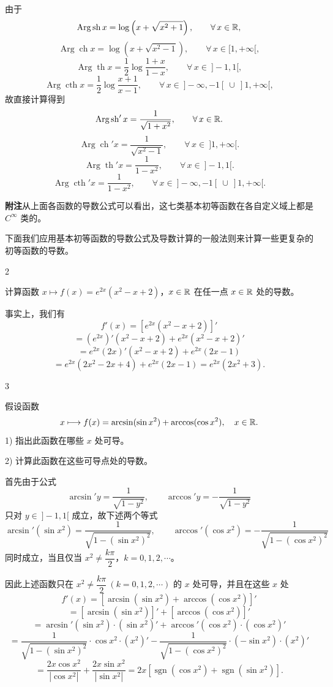 由于
\[
\operatorname{Arg}\operatorname{sh}x=\log\left(x+\sqrt{x^2+1}\right),\qquad\forall\,x\in\mathbb{R},
\]
\[
\operatorname{Arg}\operatorname{ch}x=\log\left(x+\sqrt{x^2-1}\right),\qquad\forall\,x\in[1,+\infty[,
\]
\[
\operatorname{Arg}\operatorname{th}x=\frac12\log\frac{1+x}{1-x},\qquad\forall\,x\in\ ]-1,1[,
\]
\[
\operatorname{Arg}\operatorname{cth}x=\frac12\log\frac{x+1}{x-1},\qquad\forall\,x\in\ ]-\infty,-1[\ \cup\ ]1,+\infty[,
\]
故直接计算得到
\[
\operatorname{Arg}\operatorname{sh}'x=\frac1{\sqrt{1+x^2}},\qquad\forall\,x\in\mathbb{R}.
\]
\[
\operatorname{Arg}\operatorname{ch}'x=\frac1{\sqrt{x^2-1}},\qquad\forall\,x\in\ ]1,+\infty[.
\]
\[
\operatorname{Arg}\operatorname{th}'x=\frac1{1-x^2},\qquad\forall\,x\in\ ]-1,1[.
\]
\[
\operatorname{Arg}\operatorname{cth}'x=\frac1{1-x^2},\qquad\forall\,x\in\ ]-\infty,-1[\ \cup\ ]1,+\infty[.
\]

\textbf{附注}\quad 从上面各函数的导数公式可以看出，这七类基本初等函数在各自定义域上都是 \(C^\infty\) 类的。

下面我们应用基本初等函数的导数公式及导数计算的一般法则来计算一些更复杂的初等函数的导数。

\begin{sourceexample}{2}

	计算函数 \(x\longmapsto f(x)=e^{2x}(x^2-x+2)\)，\(x\in\mathbb{R}\) 在任一点 \(x\in\mathbb{R}\) 处的导数。

	事实上，我们有
	\[
	f'(x)=[e^{2x}(x^2-x+2)]'
	\]
	\[
	=(e^{2x})'(x^2-x+2)+e^{2x}(x^2-x+2)'
	\]
	\[
	=e^{2x}(2x)'(x^2-x+2)+e^{2x}(2x-1)
	\]
	\[
	=e^{2x}(2x^2-2x+4)+e^{2x}(2x-1)=e^{2x}(2x^2+3).
	\]

\end{sourceexample}

\begin{sourceexample}{3}

	假设函数
	\[
	x\longmapsto f(x)=\arcsin(\sin x^2)+\arccos(\cos x^2),\quad x\in\mathbb{R}.
	\]
	1) 指出此函数在哪些 \(x\) 处可导。

	2) 计算此函数在这些可导点处的导数。

	首先由于公式
	\[
	\arcsin'y=\frac1{\sqrt{1-y^2}},\qquad\arccos'y=-\frac1{\sqrt{1-y^2}}
	\]
	只对 \(y\in\ ]-1,1[\) 成立，故下述两个等式
	\[
	\arcsin'(\sin x^2)=\frac1{\sqrt{1-(\sin x^2)^2}},\qquad
	\arccos'(\cos x^2)=-\frac1{\sqrt{1-(\cos x^2)^2}}
	\]
	同时成立，当且仅当 \(x^2\neq\dfrac{k\pi}{2}\)，\(k=0,1,2,\cdots\)。

	因此上述函数只在 \(x^2\neq\dfrac{k\pi}{2}\ (k=0,1,2,\cdots)\) 的 \(x\) 处可导，并且在这些 \(x\) 处
	\[
	f'(x)=[\arcsin(\sin x^2)+\arccos(\cos x^2)]'
	\]
	\[
	=[\arcsin(\sin x^2)]'+[\arccos(\cos x^2)]'
	\]
	\[
	=\arcsin'(\sin x^2)\cdot(\sin x^2)'+\arccos'(\cos x^2)\cdot(\cos x^2)'
	\]
	\[
	=\frac1{\sqrt{1-(\sin x^2)^2}}\cdot\cos x^2\cdot(x^2)'-\frac1{\sqrt{1-(\cos x^2)^2}}\cdot(-\sin x^2)\cdot(x^2)'
	\]
	\[
	=\frac{2x\cos x^2}{|\cos x^2|}+\frac{2x\sin x^2}{|\sin x^2|}=2x[\operatorname{sgn}(\cos x^2)+\operatorname{sgn}(\sin x^2)].
	\]

\end{sourceexample}

